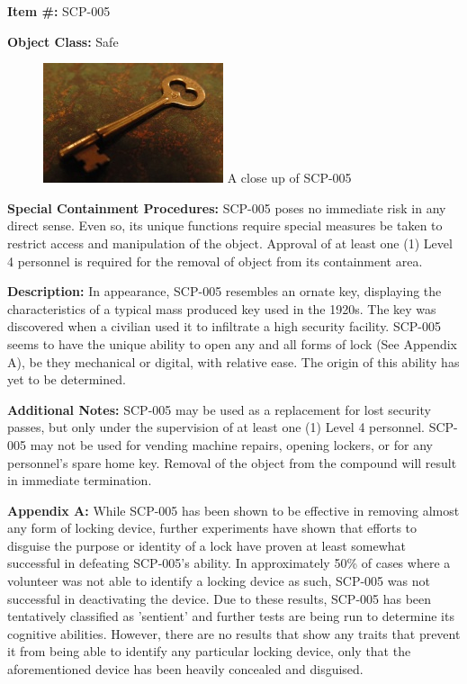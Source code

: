 \textbf{Item \#:} SCP-005

\textbf{Object Class:} Safe

\begin{figure}[h]
\begin{center}
\includegraphics[scale=1]{scp/005.jpg}
\linebreak A close up of SCP-005
\end{center}
\end{figure}

\textbf{Special Containment Procedures:} SCP-005 poses no immediate risk in any direct sense. Even so, its unique functions require special measures be taken to restrict access and manipulation of the object. Approval of at least one (1) Level 4 personnel is required for the removal of object from its containment area.

\textbf{Description:} In appearance, SCP-005 resembles an ornate key, displaying the characteristics of a typical mass produced key used in the 1920s. The key was discovered when a civilian used it to infiltrate a high security facility. SCP-005 seems to have the unique ability to open any and all forms of lock (See Appendix A), be they mechanical or digital, with relative ease. The origin of this ability has yet to be determined.

\textbf{Additional Notes:} SCP-005 may be used as a replacement for lost security passes, but only under the supervision of at least one (1) Level 4 personnel. SCP-005 may not be used for vending machine repairs, opening lockers, or for any personnel's spare home key. Removal of the object from the compound will result in immediate termination.

\textbf{Appendix A:} While SCP-005 has been shown to be effective in removing almost any form of locking device, further experiments have shown that efforts to disguise the purpose or identity of a lock have proven at least somewhat successful in defeating SCP-005's ability. In approximately 50\% of cases where a volunteer was not able to identify a locking device as such, SCP-005 was not successful in deactivating the device. Due to these results, SCP-005 has been tentatively classified as 'sentient' and further tests are being run to determine its cognitive abilities. However, there are no results that show any traits that prevent it from being able to identify any particular locking device, only that the aforementioned device has been heavily concealed and disguised.